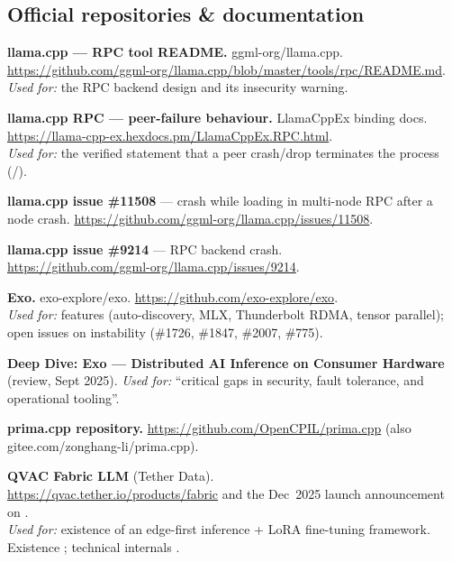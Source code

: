 \subsection{Official repositories \& documentation}
\begin{enumerate}[leftmargin=1.8em,label={[R\arabic*]}]
  \item \textbf{llama.cpp --- RPC tool README.} ggml-org/llama.cpp. \\
  \url{https://github.com/ggml-org/llama.cpp/blob/master/tools/rpc/README.md}. \\
  \emph{Used for:} the RPC backend design and its insecurity warning. \VER

  \item \textbf{llama.cpp RPC --- peer-failure behaviour.} LlamaCppEx binding
  docs. \url{https://llama-cpp-ex.hexdocs.pm/LlamaCppEx.RPC.html}. \\
  \emph{Used for:} the verified statement that a peer crash/drop terminates the
  process (/). \VER

  \item \textbf{llama.cpp issue \#11508} --- crash while loading in multi-node
  RPC after a node crash. \url{https://github.com/ggml-org/llama.cpp/issues/11508}. \VER

  \item \textbf{llama.cpp issue \#9214} --- RPC backend crash. \\
  \url{https://github.com/ggml-org/llama.cpp/issues/9214}. \VER

  \item \textbf{Exo.} exo-explore/exo. \url{https://github.com/exo-explore/exo}. \\
  \emph{Used for:} features (auto-discovery, MLX, Thunderbolt RDMA, tensor
  parallel); open issues on instability (\#1726, \#1847, \#2007, \#775). \VER

  \item \textbf{Deep Dive: Exo --- Distributed AI Inference on Consumer Hardware}
  (review, Sept 2025). \emph{Used for:} ``critical gaps in security, fault
  tolerance, and operational tooling''. \VER

  \item \textbf{prima.cpp repository.} \url{https://github.com/OpenCPIL/prima.cpp}
  (also gitee.com/zonghang-li/prima.cpp). \VER

  \item \textbf{QVAC Fabric LLM} (Tether Data). \\
  \url{https://qvac.tether.io/products/fabric} and the Dec~2025 launch
  announcement on . \\
  \emph{Used for:} existence of an edge-first inference + LoRA fine-tuning
  framework. Existence \VER; technical internals \UNK.
\end{enumerate}

